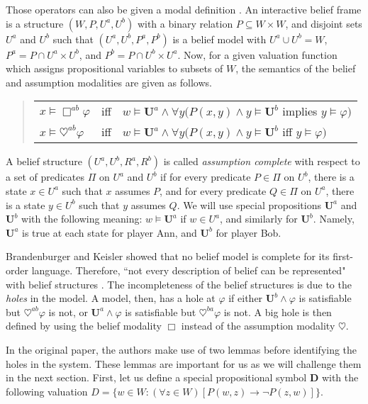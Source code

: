 \documentclass{article}
\begin{document}
Those operators can also be given a modal definition \cite{bran0}. An interactive belief frame is a structure $(W, P, U^a, U^b)$ with a binary relation $P \subseteq W \times W$, and disjoint sets $U^a$ and $U^b$ such that $(U^a, U^b, P^a, P^b)$ is a belief model with $U^a \cup U^b = W$, $P^a = P \cap U^a \times U^b$, and $P^b = P \cap U^b \times U^a$. Now, for a given valuation function which assigns propositional variables to subsets of $W$, the semantics of the belief and assumption modalities are given as follows.

\begin{quote}\begin{tabular}{lll}
$x \models \Box^{ab} \varphi $ & iff & $w \models \mathbf{U}^a \wedge \forall y (P(x, y) \wedge y \models \mathbf{U}^b$ implies  $y \models \varphi)$ \\
$x \models \heartsuit^{ab} \varphi $ & iff & $w \models \mathbf{U}^a \wedge \forall y (P(x, y) \wedge y \models \mathbf{U}^b$ iff  $y \models \varphi)$ \\
\end{tabular}\end{quote}

A belief structure $(U^{a}, U^{b}, R^{a}, R^{b})$ is called \emph{assumption complete} with respect to a set of predicates $\Pi$ on $U^{a}$ and $U^{b}$ if for every predicate $P \in \Pi$ on $U^{b}$, there is a state $x \in U^{a}$ such that $x$ assumes $P$, and for every predicate $Q \in \Pi$ on $U^a$, there is a state $y \in U^b$ such that $y$ assumes $Q$. We will use special propositions $\mathbf{U}^a$ and $\mathbf{U}^b$ with the following meaning: $w \models \mathbf{U}^a$ if $w \in U^a$, and similarly for  $\mathbf{U}^b$. Namely, $\mathbf{U}^a$ is true at each state for player Ann, and $\mathbf{U}^b$ for player Bob.

Brandenburger and Keisler showed that no belief model is complete for its first-order language. Therefore, ``not every description of belief can be represented" with belief structures \cite{bran0}. The incompleteness of the belief structures is due to the \emph{holes} in the model. A model, then, has a hole at $\varphi$ if either $\mathbf{U}^b \wedge \varphi$ is satisfiable but $\heartsuit^{ab} \varphi$ is not, or $\mathbf{U}^a \wedge \varphi$ is satisfiable but $\heartsuit^{ba} \varphi$ is not. A big hole is then defined by using the belief modality $\Box$ instead of the assumption modality $\heartsuit$.

In the original paper, the authors make use of two lemmas before identifying the holes in the system. These lemmas are important for us as we will challenge them in the next section. First, let us define a special propositional symbol $\mathbf{D}$ with the following  valuation $D = \{ w \in W : (\forall z \in W) [P(w, z) \rightarrow \neg P(z, w)] \}$.
\end{document}
